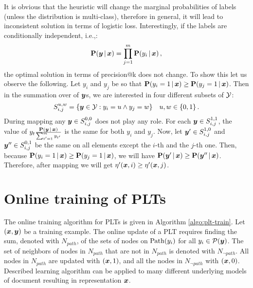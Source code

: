 \documentclass{article}
\newcommand{\prob}{\mathbf{P}}
\newcommand{\sectionBefore}{-0pt}
\newcommand{\sectionAfter}{-0pt}
\begin{document}
It is obvious that the heuristic will change the marginal probabilities of labels (unless the distribution is multi-class), therefore in general, it will lead to inconsistent solution in terms of logistic loss. 
Interestingly, if the labels are conditionally independent, i.e.,:
$$
\prob(\by \given \bx) = \prod_{j=1}^m \prob(y_i \given \bx)\,,
$$
the optimal solution in terms of precision@k does not change. To show this let us observe the following.
Let $y_i$ and $y_j$ be so that $\prob(y_i = 1 \given \bx) \ge \prob(y_j = 1 \given \bx) $. Then in the summation over of $\boldsymbol{y}$s, we are interested in four different subsets of $\mathcal{Y}$: 
$$
S_{i,j}^{u,w}  =  \{\boldsymbol{y}\in \mathcal{Y}: y_i = u \land y_j = w\} \quad u,w \in \{0,1\} \,.
$$
During mapping any $\boldsymbol{y} \in S^{0,0}_{i,j}$ does not play any role. For each $\boldsymbol{y} \in S^{1,1}_{i,j}$, the value of $y_t \frac{\prob(\by \given \bx)}{\sum_{t'=1}^m y_{t'}}$ is the same for both $y_i$ and $y_j$. Now, let $\boldsymbol{y}' \in S^{1,0}_{i,j}$ and $\boldsymbol{y}'' \in S^{0,1}_{i,j}$ be the same on all elements except the $i$-th and the $j$-th one. Then, because   $\prob(y_i = 1 \given \bx) \ge \prob(y_j = 1 \given \bx) $, we will have $\prob(\by' \given \bx) \ge \prob(\by'' \given \bx)$. Therefore, after mapping we will get $\eta'(\boldsymbol{x},i) \ge \eta'(\boldsymbol{x}, j)$. 


%
%
%


\vspace{\sectionBefore}
\section{Online training of PLTs}
\label{sec:online_PLTs}
\vspace{\sectionAfter}



The online training algorithm for PLTs is given in Algorithm \ref{algo:plt-train}. Let $(\boldsymbol{x}, \boldsymbol{y})$ be a training example. The online update of a PLT requires finding the sum, denoted with  $N_{path}$, of the sets of nodes on $\mathrm{Path}(y_i)$ for all $y_i \in \mathcal{P}(\boldsymbol{y})$. The set of neighbors of nodes in $N_{path}$ that are not in $N_{path}$ is denoted with $N_{\lnot path}$. All nodes in $N_{path}$ are updated with $(\boldsymbol{x}, 1)$, and all the nodes in $N_{\lnot path}$ with $(\boldsymbol{x}, 0)$. Described learning algorithm can be applied to many different underlying models of document resulting in representation $\boldsymbol{x}$.
\end{document}
